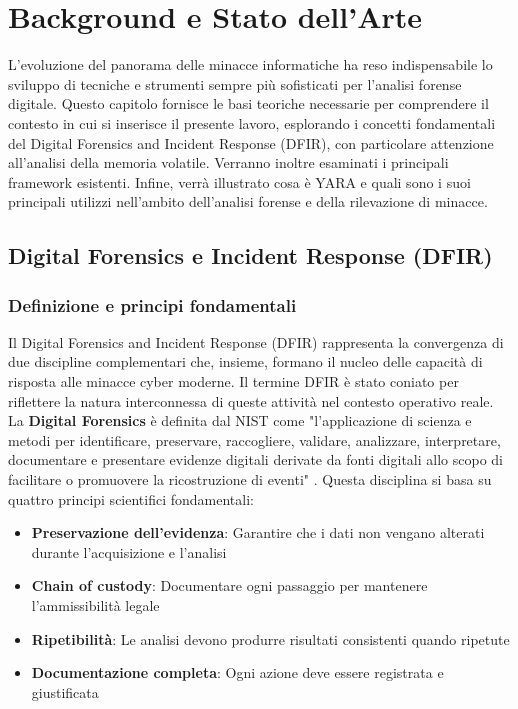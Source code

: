 \chapter{Background e Stato dell'Arte}

L'evoluzione del panorama delle minacce informatiche ha reso indispensabile lo sviluppo di tecniche e strumenti sempre più sofisticati per l'analisi forense digitale. Questo capitolo fornisce le basi teoriche necessarie per comprendere il contesto in cui si inserisce il presente lavoro, esplorando i concetti fondamentali del Digital Forensics and Incident Response (DFIR), con particolare attenzione all'analisi della memoria volatile. Verranno inoltre esaminati i principali framework esistenti. Infine, verrà illustrato cosa è YARA e quali sono i suoi principali utilizzi nell'ambito dell'analisi forense e della rilevazione di minacce.

\section{Digital Forensics e Incident Response (DFIR)}

\subsection{Definizione e principi fondamentali}

Il Digital Forensics and Incident Response (DFIR) rappresenta la convergenza di due discipline complementari che, insieme, formano il nucleo delle capacità di risposta alle minacce cyber moderne. Il termine DFIR è stato coniato per riflettere la natura interconnessa di queste attività nel contesto operativo reale.\\

La \textbf{Digital Forensics} è definita dal NIST come "l'applicazione di scienza e metodi per identificare, preservare, raccogliere, validare, analizzare, interpretare, documentare e presentare evidenze digitali derivate da fonti digitali allo scopo di facilitare o promuovere la ricostruzione di eventi" \cite{kent2006}. Questa disciplina si basa su quattro principi scientifici fondamentali:

\begin{itemize}
    \item \textbf{Preservazione dell'evidenza}: Garantire che i dati non vengano alterati durante l'acquisizione e l'analisi
    \item \textbf{Chain of custody}: Documentare ogni passaggio per mantenere l'ammissibilità legale
    \item \textbf{Ripetibilità}: Le analisi devono produrre risultati consistenti quando ripetute
    \item \textbf{Documentazione completa}: Ogni azione deve essere registrata e giustificata
\end{itemize}


